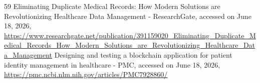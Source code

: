 \documentclass[12pt]{article}
\begin{document}
\begin{sloppypar}
\begin{thebibliography}{59}
 Eliminating Duplicate Medical Records: How Modern Solutions are Revolutionizing Healthcare Data Management - ResearchGate, accessed on June 18, 2026, \url{https://www.researchgate.net/publication/391159020_Eliminating_Duplicate_Medical_Records_How_Modern_Solutions_are_Revolutionizing_Healthcare_Data_Management}
 Designing and testing a blockchain application for patient identity management in healthcare - PMC, accessed on June 18, 2026, \url{https://pmc.ncbi.nlm.nih.gov/articles/PMC7928860/}
\end{thebibliography}
\end{sloppypar}
\end{document}
